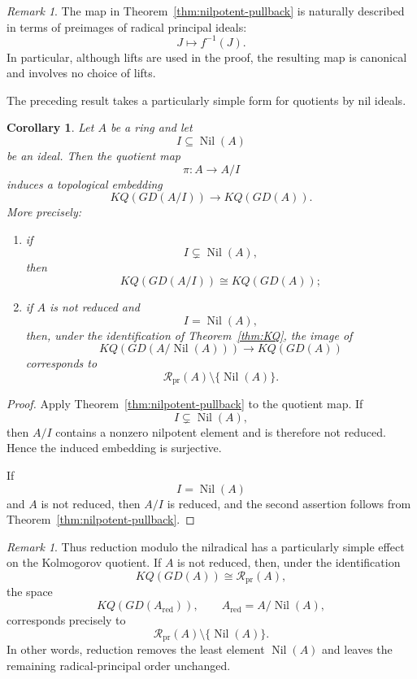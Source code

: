 \documentclass[11pt]{amsart}
\theoremstyle{plain}
\newtheorem{corollary}[theorem]{Corollary}
\theoremstyle{definition}
\theoremstyle{remark}
\newtheorem{remark}[theorem]{Remark}
\numberwithin{equation}{section}
\begin{document}
\begin{remark}
	The map in Theorem~\ref{thm:nilpotent-pullback} is naturally
	described in terms of preimages of radical principal ideals:
	\[
	J\longmapsto f^{-1}(J).
	\]
	In particular, although lifts are used in the proof, the resulting
	map is canonical and involves no choice of lifts.
\end{remark}

The preceding result takes a particularly simple form for quotients by
nil ideals.

\begin{corollary}\label{cor:nil-quotient}
	Let $A$ be a ring and let
	\[
	I\subseteq\operatorname{Nil}(A)
	\]
	be an ideal. Then the quotient map
	\[
	\pi:A\longrightarrow A/I
	\]
	induces a topological embedding
	\[
	KQ(GD(A/I))
	\longrightarrow
	KQ(GD(A)).
	\]
	More precisely:
	\begin{enumerate}
		\item if
		\[
		I\subsetneq\operatorname{Nil}(A),
		\]
		then
		\[
		KQ(GD(A/I))
		\cong
		KQ(GD(A));
		\]
		
		\item if $A$ is not reduced and
		\[
		I=\operatorname{Nil}(A),
		\]
		then, under the identification of
		Theorem~\ref{thm:KQ}, the image of
		\[
		KQ(GD(A/\operatorname{Nil}(A)))
		\longrightarrow
		KQ(GD(A))
		\]
		corresponds to
		\[
		\mathcal R_{\mathrm{pr}}(A)
		\setminus\{\operatorname{Nil}(A)\}.
		\]
	\end{enumerate}
\end{corollary}

\begin{proof}
	Apply Theorem~\ref{thm:nilpotent-pullback} to the quotient map.
	If
	\[
	I\subsetneq\operatorname{Nil}(A),
	\]
	then $A/I$ contains a nonzero nilpotent element and is therefore
	not reduced. Hence the induced embedding is surjective.
	
	If
	\[
	I=\operatorname{Nil}(A)
	\]
	and $A$ is not reduced, then $A/I$ is reduced, and the second
	assertion follows from Theorem~\ref{thm:nilpotent-pullback}.
\end{proof}

\begin{remark}
	Thus reduction modulo the nilradical has a particularly simple
	effect on the Kolmogorov quotient. If $A$ is not reduced, then,
	under the identification
	\[
	KQ(GD(A))\cong\mathcal R_{\mathrm{pr}}(A),
	\]
	the space
	\[
	KQ(GD(A_{\mathrm{red}})),
	\qquad
	A_{\mathrm{red}}=A/\operatorname{Nil}(A),
	\]
	corresponds precisely to
	\[
	\mathcal R_{\mathrm{pr}}(A)
	\setminus\{\operatorname{Nil}(A)\}.
	\]
	In other words, reduction removes the least element
	$\operatorname{Nil}(A)$ and leaves the remaining
	radical-principal order unchanged.
\end{remark}
\bigskip
\end{document}
